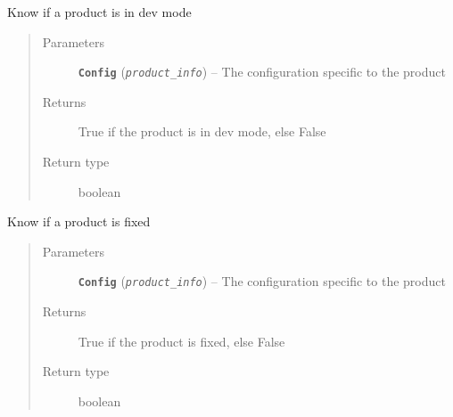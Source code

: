 \documentclass[a4paper,10pt,english]{sphinxmanual}
\begin{document}
\begin{fulllineitems}
\label{commands/apidoc/src:src.product.product_is_dev}
Know if a product is in dev mode
\begin{quote}\begin{description}
\item[{Parameters}] \leavevmode
\textbf{\texttt{Config}} (\emph{\texttt{product\_info}}) -- The configuration specific to 
the product

\item[{Returns}] \leavevmode
True if the product is in dev mode, else False

\item[{Return type}] \leavevmode
boolean

\end{description}\end{quote}

\end{fulllineitems}


\begin{fulllineitems}
\label{commands/apidoc/src:src.product.product_is_fixed}
Know if a product is fixed
\begin{quote}\begin{description}
\item[{Parameters}] \leavevmode
\textbf{\texttt{Config}} (\emph{\texttt{product\_info}}) -- The configuration specific to 
the product

\item[{Returns}] \leavevmode
True if the product is fixed, else False

\item[{Return type}] \leavevmode
boolean

\end{description}\end{quote}

\end{fulllineitems}

\end{document}
